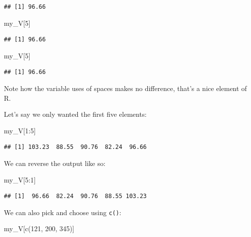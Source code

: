\documentclass[
]{book}
\newenvironment{Shaded}{\begin{snugshade}}{\end{snugshade}}
\newcommand{\DecValTok}[1]{\textcolor[rgb]{0.00,0.00,0.81}{#1}}
\newcommand{\FunctionTok}[1]{\textcolor[rgb]{0.00,0.00,0.00}{#1}}
\newcommand{\NormalTok}[1]{#1}
\newcommand{\SpecialCharTok}[1]{\textcolor[rgb]{0.00,0.00,0.00}{#1}}
\begin{document}
\begin{verbatim}
## [1] 96.66
\end{verbatim}

\begin{Shaded}
\begin{Highlighting}[]
\NormalTok{my\_V[}\DecValTok{5}\NormalTok{]}
\end{Highlighting}
\end{Shaded}

\begin{verbatim}
## [1] 96.66
\end{verbatim}

\begin{Shaded}
\begin{Highlighting}[]
\NormalTok{my\_V[}\DecValTok{5}\NormalTok{]}
\end{Highlighting}
\end{Shaded}

\begin{verbatim}
## [1] 96.66
\end{verbatim}

Note how the variable uses of spaces makes no difference, that's a nice element of R.

Let's say we only wanted the first five elements:

\begin{Shaded}
\begin{Highlighting}[]
\NormalTok{my\_V[}\DecValTok{1}\SpecialCharTok{:}\DecValTok{5}\NormalTok{]}
\end{Highlighting}
\end{Shaded}

\begin{verbatim}
## [1] 103.23  88.55  90.76  82.24  96.66
\end{verbatim}

We can reverse the output like so:

\begin{Shaded}
\begin{Highlighting}[]
\NormalTok{my\_V[}\DecValTok{5}\SpecialCharTok{:}\DecValTok{1}\NormalTok{]}
\end{Highlighting}
\end{Shaded}

\begin{verbatim}
## [1]  96.66  82.24  90.76  88.55 103.23
\end{verbatim}

We can also pick and choose using \texttt{c()}:

\begin{Shaded}
\begin{Highlighting}[]
\NormalTok{my\_V[}\FunctionTok{c}\NormalTok{(}\DecValTok{121}\NormalTok{, }\DecValTok{200}\NormalTok{, }\DecValTok{345}\NormalTok{)]}
\end{Highlighting}
\end{Shaded}
\end{document}
